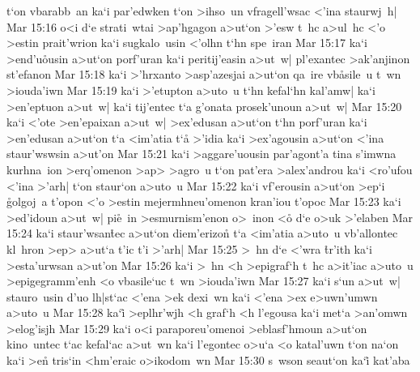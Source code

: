 t`on
vbarabb~an
ka`i
par'edwken
t`on
>ihso~un
vfragell'wsac
<'ina
staurwj~h|\bibvsend
\vs Mar 15:16
o<i
d`e
strati~wtai
>ap'hgagon
a>ut`on
>'esw
t~hc
a>ul~hc
<'o
>estin
prait'wrion
ka`i
sugkalo~usin
<'olhn
t`hn
spe~iran\bibvsend
\vs Mar 15:17
ka`i
>end'u\r{o}usin
a>ut`on
porf'uran
ka`i
peritij'easin
a>ut~w|
pl'exantec
>ak'anjinon
st'efanon\bibvsend
\vs Mar 15:18
ka`i
>'hrxanto
>asp'azesjai
a>ut`on
qa~ire
vb\r{a}sile~u
t~wn
>iouda'iwn\bibvsend
\vs Mar 15:19
ka`i
>'etupton
a>uto~u
t`hn
kefal`hn
kal'amw|
ka`i
>en'eptuon
a>ut~w|
ka`i
tij'entec
t`a
g'onata
prosek'unoun
a>ut~w|\bibvsend
\vs Mar 15:20
ka`i
<'ote
>en'epaixan
a>ut~w|
>ex'edusan
a>ut`on
t`hn
porf'uran
ka`i
>en'edusan
a>ut`on
t`a
<im'atia
t`a\r{}
>'idia
ka`i
>ex'agousin
a>ut`on
<'ina
staur'wswsin
a>ut'on\bibvsend
\vs Mar 15:21
ka`i
>aggare'uousin
par'agont'a
tina
s'imwna
kurhna~ion
>erq'omenon
>ap>
>agro~u
t`on
pat'era
>alex'androu
ka`i
<ro'ufou
<'ina
>'arh|
t`on
staur`on
a>uto~u\bibvsend
\vs Mar 15:22
ka`i
vf'erousin
a>ut`on
>ep`i
\r{g}olgoj~a
t'opon
<'o
>estin
mejermhneu'omenon
kran'iou
t'opoc\bibvsend
\vs Mar 15:23
ka`i
>ed'idoun
a>ut~w|
pi\r{e}~in
>esmurnism'enon
o>~inon
<o\r{}
d`e
o>uk
>'elaben\bibvsend
\vs Mar 15:24
ka`i
staur'wsan\r{t}ec
a>ut`on
diem'erizo\r{n}
t`a
<im'atia
a>uto~u
vb'allontec
kl~hron
>ep>
a>ut`a
t'ic
t'i
>'arh|\bibvsend
\vs Mar 15:25
>~hn
d`e
<'wra
\r{t}r'ith
ka`i
>esta'urwsan
a>ut'on\bibvsend
\vs Mar 15:26
ka`i
>~hn
<h
>epigraf`h
t~hc
a>it'iac
a>uto~u
>epigegramm'enh
<o
vbasile`uc
t~wn
>iouda'iwn\bibvsend
\vs Mar 15:27
ka`i
s`un
a>ut~w|
stauro~usin
d'uo
lh|st`ac
<'ena
>ek
dexi~wn
ka`i
<'ena
>ex
e>uwn'umwn
a>uto~u\bibvsend
\vs Mar 15:28
ka`i\r{}
>eplhr'wjh
<h
graf`h
<h
l'egousa
ka`i
met`a
>an'omwn
>elog'isjh\bibvsend
\vs Mar 15:29
ka`i
o<i
paraporeu'omenoi
>eblasf'hmoun
a>ut`on
kino~untec
t`ac
kefal`ac
a>ut~wn
ka`i
l'egontec
o>u`a
<o
katal'uwn
t`on
na`on
ka`i
>en\r{}
tris`in
<hm'eraic
o>ikodom~wn\bibvsend
\vs Mar 15:30
s~wson
seaut`on
ka`i\r{}
kat'aba
